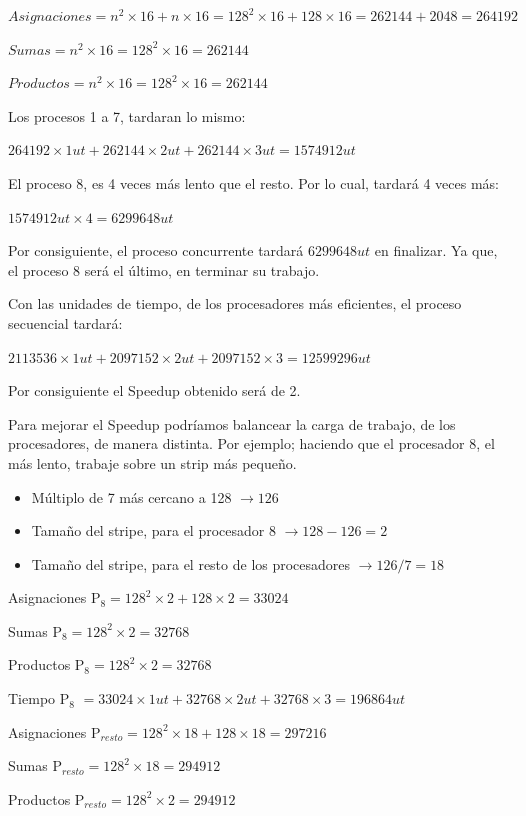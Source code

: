 \documentclass[a4paper, 10pt]{article}
\newenvironment{QandA}{
    \begin{enumerate}\bfseries}
    {\end{enumerate}
}
\newenvironment{answered}{\par\normalfont}{}
\begin{document}
\begin{QandA}
\begin{enumerate}
\begin{answered}
$Asignaciones = n^2 \times 16 + n \times 16 = 128^2 \times 16 + 128 \times 16 = 262144 + 2048 = 264192$

$Sumas = n^2 \times 16 = 128^2 \times 16 = 262144$

$Productos = n^2 \times 16 = 128^2 \times 16 = 262144$

Los procesos 1 a 7, tardaran lo mismo:

$264192 \times 1 ut + 262144 \times 2 ut + 262144 \times 3 ut = 1574912 ut$

El proceso 8, es 4 veces más lento que el resto. Por lo cual, tardará 4 veces más:

$1574912 ut \times 4 = 6299648 ut$

Por consiguiente, el proceso concurrente tardará $6299648 ut$ en finalizar. Ya que, el proceso 8 será el último, en terminar su trabajo.

Con las unidades de tiempo, de los procesadores más eficientes, el proceso secuencial tardará:

$2113536 \times 1 ut + 2097152 \times 2 ut + 2097152 \times 3 = 12599296 ut$

Por consiguiente el Speedup obtenido será de 2.

Para mejorar el Speedup podríamos balancear la carga de trabajo, de los procesadores, de manera distinta. Por ejemplo; haciendo que el procesador 8, el más lento, trabaje sobre un strip más pequeño.

\begin{itemize}
    \item Múltiplo de 7 más cercano a 128 $\rightarrow 126$
    \item Tamaño del stripe, para el procesador 8 $\rightarrow 128 - 126 = 2$
    \item Tamaño del stripe, para el resto de los procesadores $\rightarrow 126/7 = 18$
\end{itemize}

Asignaciones P$_{8} = 128^2 \times 2 + 128 \times 2 = 33024$

Sumas P$_{8} = 128^2 \times 2 = 32768$

Productos P$_{8} = 128^2 \times 2 = 32768$

Tiempo P$_8$ $= 33024 \times 1 ut + 32768 \times 2 ut + 32768 \times 3 = 196864 ut$

Asignaciones P$_{resto} = 128^2 \times 18 + 128 \times 18 = 297216$

Sumas P$_{resto} = 128^2 \times 18 = 294912$

Productos P$_{resto} = 128^2 \times 2 = 294912$


\end{answered}
\end{enumerate}
\end{QandA}
\end{document}
